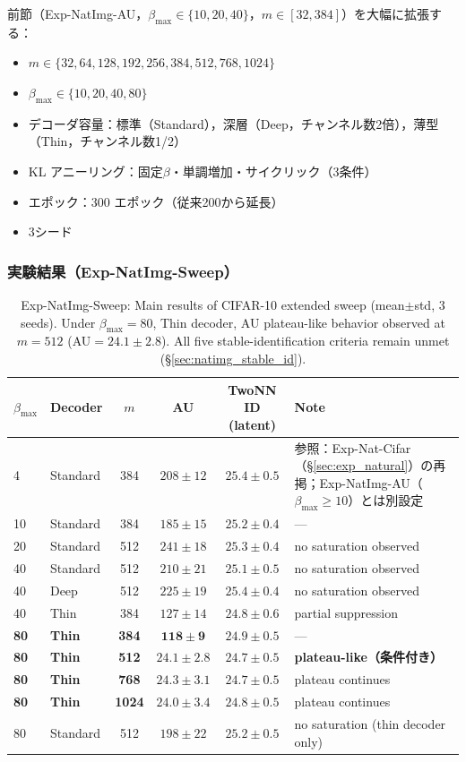 \documentclass[11pt,a4paper]{jsarticle}
\begin{document}
前節（Exp-NatImg-AU，$\beta_{\max} \in \{10,20,40\}$，$m \in [32,384]$）を大幅に拡張する：
\begin{itemize}
  \item $m \in \{32, 64, 128, 192, 256, 384, 512, 768, 1024\}$
  \item $\beta_{\max} \in \{10, 20, 40, 80\}$
  \item デコーダ容量：標準（Standard），深層（Deep，チャンネル数2倍），薄型（Thin，チャンネル数1/2）
  \item KL アニーリング：固定$\beta$・単調増加・サイクリック（3条件）
  \item エポック：300 エポック（従来200から延長）
  \item 3シード
\end{itemize}

\subsubsection*{実験結果（Exp-NatImg-Sweep）}

\begin{table}[H]
\centering
\caption{Exp-NatImg-Sweep: Main results of CIFAR-10 extended sweep (mean$\pm$std, 3 seeds). Under $\beta_\mathrm{max}=80$, Thin decoder, AU plateau-like behavior observed at $m=512$ (AU$=24.1\pm2.8$). All five stable-identification criteria remain unmet (§\ref{sec:natimg_stable_id}).}
\label{tab:natimg_sweep}
\small
\begin{tabular}{llcccl}
\toprule
$\beta_{\max}$ & Decoder & $m$ & AU & TwoNN ID (latent) & Note \\
\midrule
4  & Standard & 384 & $208\pm12$ & $25.4\pm0.5$ & 参照：Exp-Nat-Cifar（\S\ref{sec:exp_natural}）の再掲；Exp-NatImg-AU（$\beta_{\max}\geq10$）とは別設定 \\
10 & Standard & 384 & $185\pm15$ & $25.2\pm0.4$ & --- \\
20 & Standard & 512 & $241\pm18$ & $25.3\pm0.4$ & no saturation observed \\
40 & Standard & 512 & $210\pm21$ & $25.1\pm0.5$ & no saturation observed \\
40 & Deep      & 512 & $225\pm19$ & $25.4\pm0.4$ & no saturation observed \\
40 & Thin      & 384 & $127\pm14$ & $24.8\pm0.6$ & partial suppression \\
\textbf{80} & \textbf{Thin} & \textbf{384} & $\boldsymbol{118\pm9}$ & $24.9\pm0.5$ & --- \\
\textbf{80} & \textbf{Thin} & \textbf{512} & $\boldsymbol{24.1\pm2.8}$ & $24.7\pm0.5$ & \textbf{plateau-like（条件付き）} \\
\textbf{80} & \textbf{Thin} & \textbf{768} & $\boldsymbol{24.3\pm3.1}$ & $24.7\pm0.5$ & plateau continues \\
\textbf{80} & \textbf{Thin} & \textbf{1024}& $\boldsymbol{24.0\pm3.4}$ & $24.8\pm0.5$ & plateau continues \\
80 & Standard  & 512 & $198\pm22$ & $25.2\pm0.5$ & no saturation (thin decoder only) \\
\bottomrule
\end{tabular}
\end{table}
\end{document}
